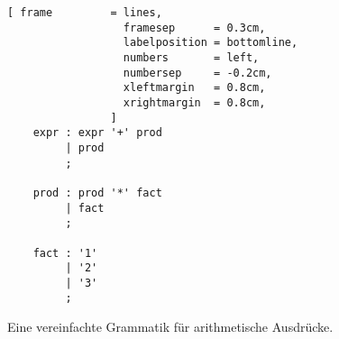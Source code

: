 \begin{figure}[!ht]
\centering
\begin{Verbatim}[ frame         = lines, 
                  framesep      = 0.3cm, 
                  labelposition = bottomline,
                  numbers       = left,
                  numbersep     = -0.2cm,
                  xleftmargin   = 0.8cm,
                  xrightmargin  = 0.8cm,
                ]
    expr : expr '+' prod
         | prod
         ;
    
    prod : prod '*' fact
         | fact
         ;
    
    fact : '1'
         | '2'
         | '3'
         ;
\end{Verbatim}
\vspace*{-0.3cm}
  \caption{Eine vereinfachte Grammatik f\"ur arithmetische Ausdr\"ucke.}
  \label{fig:expr-small} 
\end{figure}


